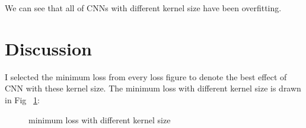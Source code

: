 \documentclass[a4paper,10pt]{article}
\begin{document}
We can see that all of CNNs with different kernel size have been overfitting. 

\section{Discussion}

I selected the minimum loss from every loss figure to denote the best effect of CNN with these kernel size. The minimum loss with different kernel size is drawn in Fig ~\ref{Fig.minimum-loss}:

\begin{figure}[htpb] \centering    
{}     
\caption{minimum loss with different kernel size}     
\label{Fig.minimum-loss}     
\end{figure}
\end{document}
